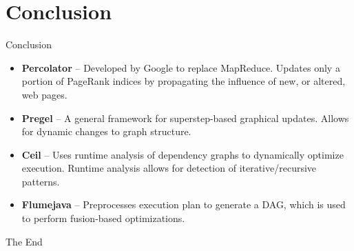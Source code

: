 \documentclass{beamer}
\begin{document}
\section{Conclusion}

\begin{frame}{Conclusion}

\begin{itemize}
\item \textbf{Percolator} -- Developed by Google to replace MapReduce.  Updates only a portion of PageRank indices by propagating the influence of new, or altered, web pages.
\item \textbf{Pregel} -- A general framework for superstep-based graphical updates.  Allows for dynamic changes to graph structure.
\item \textbf{Ceil} -- Uses runtime analysis of dependency graphs to dynamically optimize execution.  Runtime analysis allows for detection of iterative/recursive patterns.
\item \textbf{Flumejava} -- Preprocesses execution plan to generate a DAG, which is used to perform fusion-based optimizations.
\end{itemize}

\end{frame}



\begin{frame}
\Huge{\centerline{The End}}
\end{frame}


%
%
\end{document}
